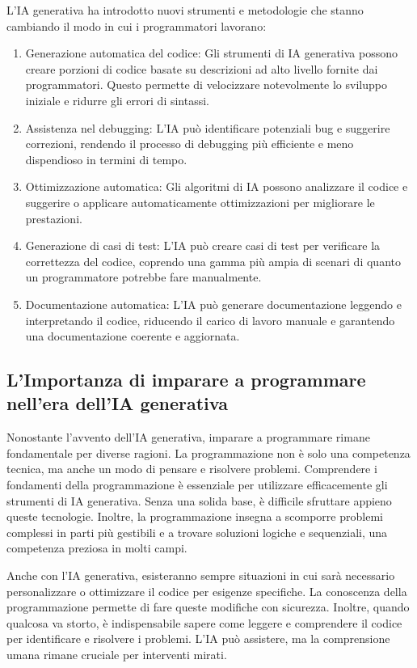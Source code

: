 \documentclass[
  letterpaper,
]{scrbook}
\begin{document}
L'IA generativa ha introdotto nuovi strumenti e metodologie che stanno
cambiando il modo in cui i programmatori lavorano:

\begin{enumerate}
\def\labelenumi{\arabic{enumi}.}
\item
  Generazione automatica del codice: Gli strumenti di IA generativa
  possono creare porzioni di codice basate su descrizioni ad alto
  livello fornite dai programmatori. Questo permette di velocizzare
  notevolmente lo sviluppo iniziale e ridurre gli errori di sintassi.
\item
  Assistenza nel debugging: L'IA può identificare potenziali bug e
  suggerire correzioni, rendendo il processo di debugging più efficiente
  e meno dispendioso in termini di tempo.
\item
  Ottimizzazione automatica: Gli algoritmi di IA possono analizzare il
  codice e suggerire o applicare automaticamente ottimizzazioni per
  migliorare le prestazioni.
\item
  Generazione di casi di test: L'IA può creare casi di test per
  verificare la correttezza del codice, coprendo una gamma più ampia di
  scenari di quanto un programmatore potrebbe fare manualmente.
\item
  Documentazione automatica: L'IA può generare documentazione leggendo e
  interpretando il codice, riducendo il carico di lavoro manuale e
  garantendo una documentazione coerente e aggiornata.
\end{enumerate}

\subsection{L'Importanza di imparare a programmare nell'era dell'IA
generativa}\label{limportanza-di-imparare-a-programmare-nellera-dellia-generativa}

Nonostante l'avvento dell'IA generativa, imparare a programmare rimane
fondamentale per diverse ragioni. La programmazione non è solo una
competenza tecnica, ma anche un modo di pensare e risolvere problemi.
Comprendere i fondamenti della programmazione è essenziale per
utilizzare efficacemente gli strumenti di IA generativa. Senza una
solida base, è difficile sfruttare appieno queste tecnologie. Inoltre,
la programmazione insegna a scomporre problemi complessi in parti più
gestibili e a trovare soluzioni logiche e sequenziali, una competenza
preziosa in molti campi.

Anche con l'IA generativa, esisteranno sempre situazioni in cui sarà
necessario personalizzare o ottimizzare il codice per esigenze
specifiche. La conoscenza della programmazione permette di fare queste
modifiche con sicurezza. Inoltre, quando qualcosa va storto, è
indispensabile sapere come leggere e comprendere il codice per
identificare e risolvere i problemi. L'IA può assistere, ma la
comprensione umana rimane cruciale per interventi mirati.
\end{document}

